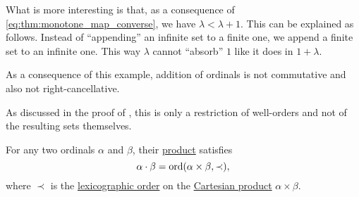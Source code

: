 \begin{example}
  What is more interesting is that, as a consequence of \eqref{eq:thm:monotone_map_converse}, we have \( \lambda < \lambda + 1 \). This can be explained as follows. Instead of \enquote{appending} an infinite set to a finite one, we append a finite set to an infinite one. This way \( \lambda \) cannot \enquote{absorb} \( 1 \) like it does in \( 1 + \lambda \).

  As a consequence of this example, addition of ordinals is not commutative and also not right-cancellative.

  As discussed in the proof of , this is only a restriction of well-orders and not of the resulting sets themselves.
\end{example}

\begin{proposition}\label{thm:ordinal_multiplication_cartesian_product}
  For any two ordinals \( \alpha \) and \( \beta \), their \hyperref[def:ordinal_arithmetic/multiplication]{product} satisfies
  \begin{equation*}
    \alpha \cdot \beta = \operatorname{ord}(\alpha \times \beta, \prec),
  \end{equation*}
  where \( \prec \) is the \hyperref[def:lexicographic_order]{lexicographic order} on the \hyperref[def:cartesian_product]{Cartesian product} \( \alpha \times \beta \).
\end{proposition}
